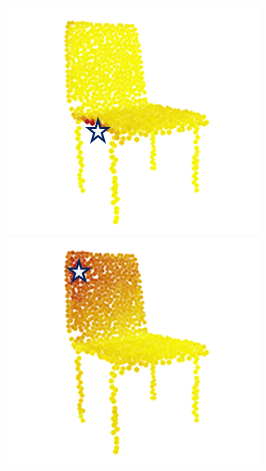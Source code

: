 \documentclass[letterpaper]{article} %
\begin{document}
\begin{figure}[htbp]
\begin{center}
\begin{minipage}[b]{0.8\linewidth}
\begin{center}
\begin{minipage}[b]{0.12\linewidth}
\begin{center}
\end{center}
\end{minipage}
\begin{minipage}[b]{0.12\linewidth}
\begin{center}
\includegraphics[width=1.0\linewidth]{images/atten_pic/chair_feature_2.png}
\end{center}
\end{minipage}
\begin{minipage}[b]{0.12\linewidth}
\begin{center}
\includegraphics[width=1.0\linewidth]{images/atten_pic/chair_feature_3.png}

\end{center}
\end{minipage}
\end{center}
\end{minipage}
\end{center}
\end{figure}
\end{document}

